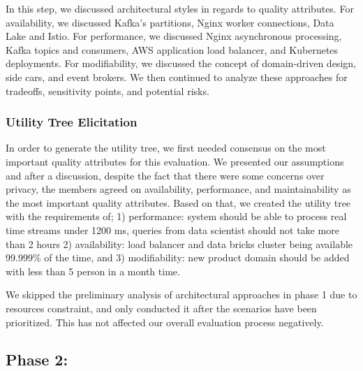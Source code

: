 \documentclass[conference]{IEEEtran}
\begin{document}

In this step, we discussed architectural styles in regards to quality attributes. For availability, we discussed Kafka's partitions, Nginx worker connections, Data Lake and Istio.  For performance, we discussed Nginx asynchronous processing, Kafka topics and consumers, AWS application load balancer, and Kubernetes deployments. For modifiability, we discussed the concept of domain-driven design, side cars, and event brokers. We then continued to analyze these approaches for tradeoffs, sensitivity points, and potential risks. 


\subsubsection{Utility Tree Elicitation}

In order to generate the utility tree, we first needed consensus on the most important quality attributes for this evaluation. We presented our assumptions and after a discussion, despite the fact that there were some concerns over privacy, the members agreed on availability, performance, and maintainability as the most important quality attributes. Based on that, we created the utility tree with the requirements of; 1) performance: system should be able to process real time streams under 1200 ms, queries from data scientist should not take more than 2 hours 2) availability: load balancer and data bricks cluster being available 99.999\% of the time, and 3) modifiability: new product domain should be added with less than 5 person in a month time.

We skipped the preliminary analysis of architectural approaches in phase 1 due to resources constraint, and only conducted it after the scenarios have been prioritized. This has not affected our overall evaluation process negatively.



\subsection{Phase 2:}

\end{document}
